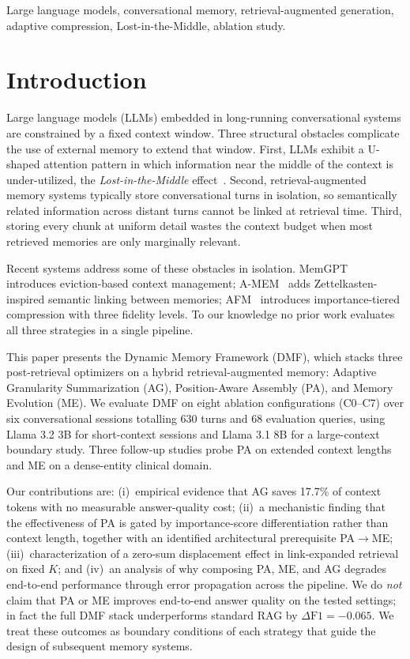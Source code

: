 \documentclass[conference]{IEEEtran}
\begin{document}
\begin{IEEEkeywords}
Large language models, conversational memory, retrieval-augmented generation, adaptive compression, Lost-in-the-Middle, ablation study.
\end{IEEEkeywords}

\section{Introduction}
\label{sec:intro}

Large language models (LLMs) embedded in long-running conversational systems are constrained by a fixed context window. Three structural obstacles complicate the use of external memory to extend that window. First, LLMs exhibit a U-shaped attention pattern in which information near the middle of the context is under-utilized, the \emph{Lost-in-the-Middle} effect~\cite{liu2023lost}. Second, retrieval-augmented memory systems typically store conversational turns in isolation, so semantically related information across distant turns cannot be linked at retrieval time. Third, storing every chunk at uniform detail wastes the context budget when most retrieved memories are only marginally relevant.

Recent systems address some of these obstacles in isolation. MemGPT~\cite{packer2023memgpt} introduces eviction-based context management; A-MEM~\cite{xu2024amem} adds Zettelkasten-inspired semantic linking between memories; AFM~\cite{cruz2025afm} introduces importance-tiered compression with three fidelity levels. To our knowledge no prior work evaluates all three strategies in a single pipeline.

This paper presents the Dynamic Memory Framework (DMF), which stacks three post-retrieval optimizers on a hybrid retrieval-augmented memory: Adaptive Granularity Summarization (AG), Position-Aware Assembly (PA), and Memory Evolution (ME). We evaluate DMF on eight ablation configurations (C0--C7) over six conversational sessions totalling 630 turns and 68 evaluation queries, using Llama 3.2 3B for short-context sessions and Llama 3.1 8B for a large-context boundary study. Three follow-up studies probe PA on extended context lengths and ME on a dense-entity clinical domain.

Our contributions are: (i)~empirical evidence that AG saves 17.7\% of context tokens with no measurable answer-quality cost; (ii)~a mechanistic finding that the effectiveness of PA is gated by importance-score differentiation rather than context length, together with an identified architectural prerequisite PA$\to$ME; (iii)~characterization of a zero-sum displacement effect in link-expanded retrieval on fixed $K$; and (iv)~an analysis of why composing PA, ME, and AG degrades end-to-end performance through error propagation across the pipeline. We do \emph{not} claim that PA or ME improves end-to-end answer quality on the tested settings; in fact the full DMF stack underperforms standard RAG by $\Delta\mathrm{F1}=-0.065$. We treat these outcomes as boundary conditions of each strategy that guide the design of subsequent memory systems.
\end{document}
